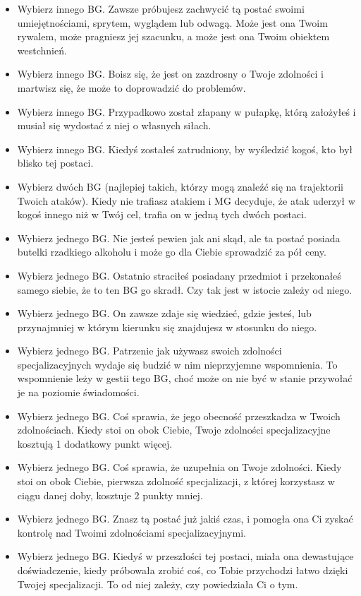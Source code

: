 \begin{itemize}
\item Wybierz innego BG. Zawsze próbujesz zachwycić tą postać swoimi umiejętnościami, sprytem, wyglądem lub odwagą. Może jest ona Twoim rywalem, może pragniesz jej szacunku, a może jest ona Twoim obiektem westchnień.
\item Wybierz innego BG. Boisz się, że jest on zazdrosny o Twoje zdolności i martwisz się, że może to doprowadzić do problemów. 
\item Wybierz innego BG. Przypadkowo został złapany w pułapkę, którą założyłeś i musiał się wydostać z niej o własnych siłach.
\item Wybierz innego BG. Kiedyś zostałeś zatrudniony, by wyśledzić kogoś, kto był blisko tej postaci.
\item Wybierz dwóch BG (najlepiej takich, którzy mogą znaleźć się na trajektorii Twoich ataków). Kiedy nie trafiasz atakiem i MG decyduje, że atak uderzył w kogoś innego niż w Twój cel, trafia on w jedną tych dwóch postaci.
\item Wybierz jednego BG. Nie jesteś pewien jak ani skąd, ale ta postać posiada butelki rzadkiego alkoholu i może go dla Ciebie sprowadzić za pół ceny.
\item Wybierz jednego BG. Ostatnio straciłeś posiadany przedmiot i przekonałeś samego siebie, że to ten BG go skradł. Czy tak jest w istocie zależy od niego.
\item Wybierz jednego BG. On zawsze zdaje się wiedzieć, gdzie jesteś, lub przynajmniej w którym kierunku się znajdujesz w stosunku do niego.
\item Wybierz jednego BG. Patrzenie jak używasz swoich zdolności specjalizacyjnych wydaje się budzić w nim nieprzyjemne wspomnienia. To wspomnienie leży w gestii tego BG, choć może on nie być w stanie przywołać je na poziomie świadomości.
\item Wybierz jednego BG. Coś sprawia, że jego obecność przeszkadza w Twoich zdolnościach. Kiedy stoi on obok Ciebie, Twoje zdolności specjalizacyjne kosztują 1 dodatkowy punkt więcej.
\item Wybierz jednego BG. Coś sprawia, że uzupełnia on Twoje zdolności. Kiedy stoi on obok Ciebie, pierwsza zdolność specjalizacji, z której korzystasz w ciągu danej doby, kosztuje 2 punkty mniej.
\item Wybierz jednego BG. Znasz tą postać już jakiś czas, i pomogła ona Ci zyskać kontrolę nad Twoimi zdolnościami specjalizacyjnymi.
\item Wybierz jednego BG. Kiedyś w przeszłości tej postaci, miała ona dewastujące doświadczenie, kiedy próbowała zrobić coś, co Tobie przychodzi łatwo dzięki Twojej specjalizacji. To od niej zależy, czy powiedziała Ci o tym.

\end{itemize}
